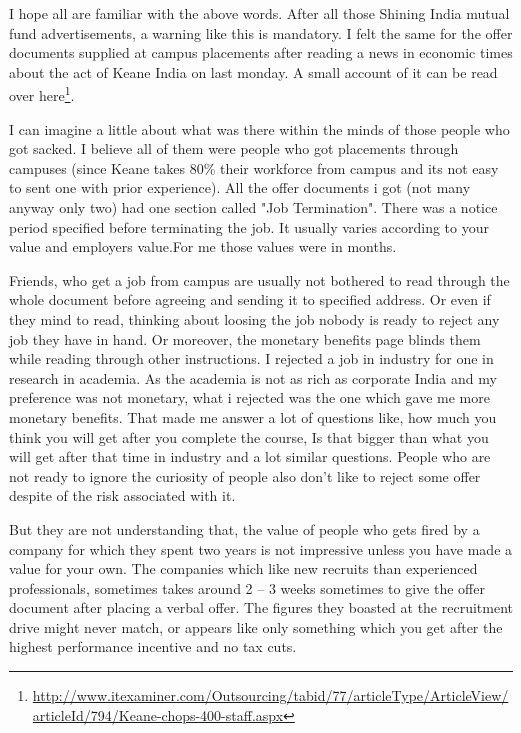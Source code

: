\vskip 2pt


I hope all are familiar with the above words. After all those Shining India mutual fund advertisements, a warning like this is mandatory. I felt the same for the offer documents supplied at campus placements after reading a news in economic times about the act of Keane India on last monday. A small account of it can be read over here\footnote{\url{http://www.itexaminer.com/Outsourcing/tabid/77/articleType/ArticleView/articleId/794/Keane-chops-400-staff.aspx}}.

I can imagine a little about what was there within the minds of those people who got sacked. I believe all of them were people who got placements through campuses (since Keane takes 80\% their workforce from campus and its not easy to sent one with prior experience). All the offer documents i got (not many anyway only two) had one section called "Job Termination". There was a notice period specified before terminating the job. It usually varies according to your value and employers value.For me those values were in months.

Friends, who get a job from campus are usually not bothered to read through the whole document before agreeing and sending it to specified address. Or even if they mind to read, thinking about loosing the job nobody is ready to reject any job they have in hand. Or moreover, the monetary benefits page blinds them while reading through other instructions. I rejected a job in industry for one in research in academia. As the academia is not as rich as corporate India and my preference was not monetary, what i rejected was the one which gave me more monetary benefits. That made me answer a lot of questions like, how much you think you will get after you complete the course, Is that bigger than what you will get after that time in industry and a lot similar questions. People who are not ready to ignore the curiosity of people also don’t like to reject some offer despite of the risk associated with it.

But they are not understanding that, the value of people who gets fired by a company for which they spent two years is not impressive unless you have made a value for your own. The companies which like new recruits than experienced professionals, sometimes takes around 2 – 3 weeks sometimes to give the offer document after placing a verbal offer. The figures they boasted at the recruitment drive might never match, or appears like only something which you get after the highest performance incentive and no tax cuts. 

